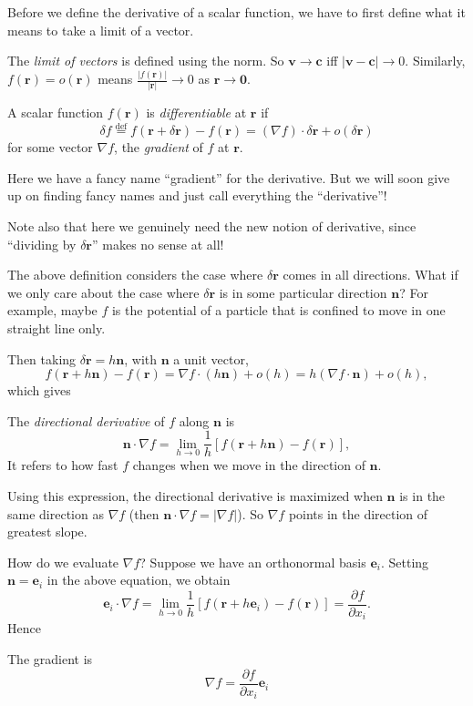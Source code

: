 \documentclass[a4paper]{article}
\begin{document}
Before we define the derivative of a scalar function, we have to first define what it means to take a limit of a vector.
\begin{defi}
  The \emph{limit of vectors} is defined using the norm. So $\mathbf{v}\to \mathbf{c}$ iff $|\mathbf{v} - \mathbf{c}| \to 0$. Similarly, $f(\mathbf{r}) = o(\mathbf{r})$ means $\frac{|f(\mathbf{r})|}{|\mathbf{r}|} \to 0$ as $\mathbf{r}\to \mathbf{0}$.
\end{defi}

\begin{defi}
  A scalar function $f(\mathbf{r})$ is \emph{differentiable} at $\mathbf{r}$ if
  \[
    \delta f \stackrel{\text{def}}{=} f(\mathbf{r} + \delta \mathbf{r}) - f(\mathbf{r}) = (\nabla f)\cdot \delta \mathbf{r} + o(\delta \mathbf{r})
  \]
  for some vector $\nabla f$, the \emph{gradient} of $f$ at $\mathbf{r}$.
\end{defi}
Here we have a fancy name ``gradient'' for the derivative. But we will soon give up on finding fancy names and just call everything the ``derivative''!

Note also that here we genuinely need the new notion of derivative, since ``dividing by $\delta \mathbf{r}$'' makes no sense at all!

The above definition considers the case where $\delta \mathbf{r}$ comes in all directions. What if we only care about the case where $\delta \mathbf{r}$ is in some particular direction $\mathbf{n}$? For example, maybe $f$ is the potential of a particle that is confined to move in one straight line only.

Then taking $\delta \mathbf{r} = h\mathbf{n}$, with $\mathbf{n}$ a unit vector,
\[
  f(\mathbf{r} + h\mathbf{n}) - f(\mathbf{r}) = \nabla f \cdot (h\mathbf{n}) + o(h) = h(\nabla f\cdot \mathbf{n}) + o(h),
\]
which gives
\begin{defi}
  The \emph{directional derivative} of $f$ along $\mathbf{n}$ is
  \[
    \mathbf{n}\cdot \nabla f = \lim_{h \to 0} \frac{1}{h}[f(\mathbf{r} + h\mathbf{n}) - f(\mathbf{r})],
  \]
  It refers to how fast $f$ changes when we move in the direction of $\mathbf{n}$.
\end{defi}
Using this expression, the directional derivative is maximized when $\mathbf{n}$ is in the same direction as $\nabla f$ (then $\mathbf{n}\cdot \nabla f = |\nabla f|$). So $\nabla f$ points in the direction of greatest slope.

How do we evaluate $\nabla f$? Suppose we have an orthonormal basis $\mathbf{e}_i$. Setting $\mathbf{n} = \mathbf{e}_i$ in the above equation, we obtain
\[
  \mathbf{e}_i \cdot \nabla f = \lim_{h\to 0} \frac{1}{h}[f(\mathbf{r} + h\mathbf{e}_i) - f(\mathbf{r})] = \frac{\partial f}{\partial x_i}.
\]
Hence
\begin{thm}
  The gradient is
  \[
    \nabla f = \frac{\partial f}{\partial x_i}\mathbf{e}_i
  \]
\end{thm}
\end{document}
